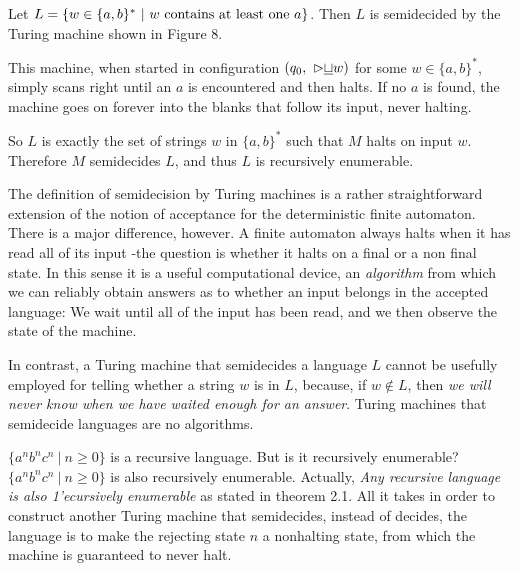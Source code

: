 \begin{example}{}

Let $L = \{ w \in \{a, b\}^*\ |\ w \textnormal{ contains at least one } a \}$. Then $L$ is semidecided by the Turing machine shown in Figure 8.
\begin{figure}[H]
  \centering
  \caption{}
  \label{fig:4.8}
\end{figure}
\quad This machine, when started in configuration $(q_0,\ {\vartriangleright}{\underline{\sqcup}}w)$ for some $w \in \{ a, b \}^*$, simply scans right until an $a$ is encountered and then halts. If no $a$ is found, the machine goes on forever into the blanks that follow its input, never halting.

\quad So $L$ is exactly the set of strings $w$ in $\{ a, b \}^*$ such that $M$ halts on input $w$. Therefore $M$ semidecides $L$, and thus $L$ is recursively enumerable.
\end{example}

The definition of semidecision by Turing machines is a rather straightforward extension of the notion of acceptance for the deterministic finite automaton. There is a major difference, however. A finite automaton always halts when it has read all of its input -the question is whether it halts on a final or a non final state. In this sense it is a useful computational device, an \textit{algorithm} from which we can reliably obtain answers as to whether an input belongs in the accepted language: We wait until all of the input has been read, and we then observe the state of the machine.

In contrast, a Turing machine that semidecides a language $L$ cannot be usefully employed for telling whether a string $w$ is in $L$, because, if $w \notin L$, then \textit{we will never know when we have waited enough for an answer}. Turing machines that semidecide languages are no algorithms.

$\{ a^nb^nc^n\ |\ n \geq 0 \}$ is a recursive language. But is it recursively enumerable? $\{ a^nb^nc^n\ |\ n \geq 0 \}$ is also recursively enumerable. Actually, \textit{Any recursive language is also 1'ecursively enumerable} as stated in theorem 2.1. All it takes in order to construct another Turing machine that semidecides, instead of decides, the language is to make the rejecting state $n$ a nonhalting state, from which the machine is guaranteed to never halt.

